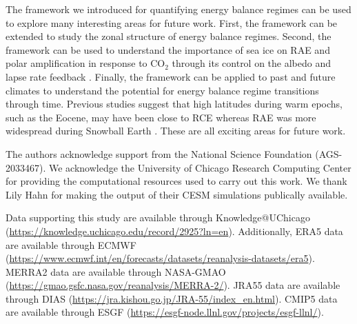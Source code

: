 \documentclass{ametsocV5}
\begin{document}
The framework we introduced for quantifying energy balance regimes can be used to explore many interesting areas for future work. First, the framework can be extended to study the zonal structure of energy balance regimes. Second, the framework can be used to understand the importance of sea ice on RAE and polar amplification in response to CO$_2$ through its control on the albedo and lapse rate feedback \citep{feldl2020}. Finally, the framework can be applied to past and future climates to understand the potential for energy balance regime transitions through time. Previous studies suggest that high latitudes during warm epochs, such as the Eocene, may have been close to RCE \citep{abbot2008a} whereas RAE was more widespread during Snowball Earth \citep{pierrehumbert2005}. These are all exciting areas for future work.

\acknowledgments
The authors acknowledge support from the National Science Foundation (AGS-2033467). We acknowledge the University of Chicago Research Computing Center for providing the computational resources used to carry out this work. We thank Lily Hahn for making the output of their CESM simulations publically available.

% 
%
\datastatement
Data supporting this study are available through Knowledge@UChicago (\url{https://knowledge.uchicago.edu/record/2925?ln=en}). Additionally, ERA5 data are available through ECMWF (\url{https://www.ecmwf.int/en/forecasts/datasets/reanalysis-datasets/era5}). MERRA2 data are available through NASA-GMAO (\url{https://gmao.gsfc.nasa.gov/reanalysis/MERRA-2/}). JRA55 data are available through DIAS (\url{https://jra.kishou.go.jp/JRA-55/index_en.html}). CMIP5 data are available through ESGF (\url{https://esgf-node.llnl.gov/projects/esgf-llnl/}). 

%
\end{document}
